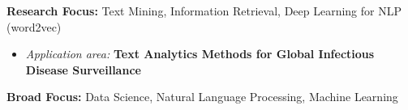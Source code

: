 \par{\textbf{Research Focus: } Text Mining, Information Retrieval, Deep Learning for NLP (word2vec)\vspace{0.5em}
\begin{itemize}
  \item \textit{Application area:} \textbf{Text Analytics Methods for Global Infectious Disease Surveillance}\\
\end{itemize}
        \textbf{Broad Focus:} Data Science, Natural Language Processing, Machine Learning\vspace{0.5em}
}
\vspace{1em}
